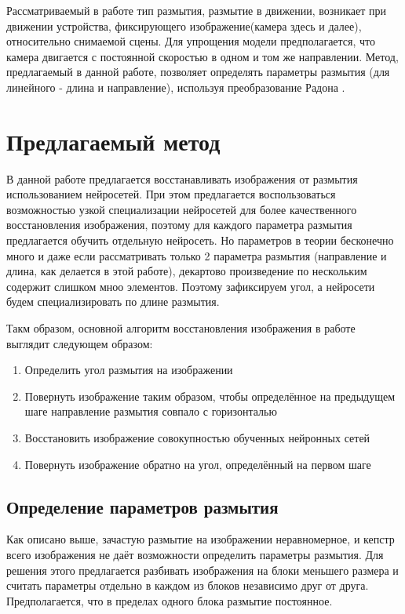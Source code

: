 Рассматриваемый в работе тип размытия, размытие в движении, возникает при движении устройства, фиксирующего изображение(камера здесь и далее), относительно снимаемой сцены. 
Для упрощения модели предполагается, что камера двигается с постоянной скоростью в одном и том же направлении. Метод, предлагаемый в данной работе, позволяет определять параметры размытия (для линейного - длина и направление), используя преобразование Радона \cite{oliv}.


\newpage
\section{Предлагаемый метод}

В данной работе предлагается восстанавливать изображения от размытия использованием нейросетей. При этом предлагается воспользоваться возможностью узкой специализации нейросетей для более качественного восстановления изображения, поэтому для каждого параметра размытия предлагается обучить отдельную нейросеть. Но параметров в теории бесконечно много и даже если рассматривать только 2 параметра размытия (направление и длина, как делается в этой работе), декартово произведение по нескольким содержит слишком мноо элементов. Поэтому зафиксируем угол, а нейросети будем специализировать по длине размытия.
\par
Такм образом, основной алгоритм восстановления изображения в работе выглядит следующем образом:
\begin{enumerate} 
    \item Определить угол размытия на изображении
    \item Повернуть изображение таким образом, чтобы определённое на предыдущем шаге направление размытия совпало с горизонталью
    \item Восстановить изображение совокупностью обученных нейронных сетей 
    \item Повернуть изображение обратно на угол, определённый на первом шаге
\end{enumerate}


\subsection{Определение параметров размытия}

Как описано выше, зачастую размытие на изображении неравномерное, и кепстр всего изображения не даёт возможности определить параметры размытия. Для решения этого предлагается разбивать изображения на блоки меньшего размера и считать параметры отдельно в каждом из блоков независимо друг от друга.
Предполагается, что в пределах одного блока размытие постоянное.

